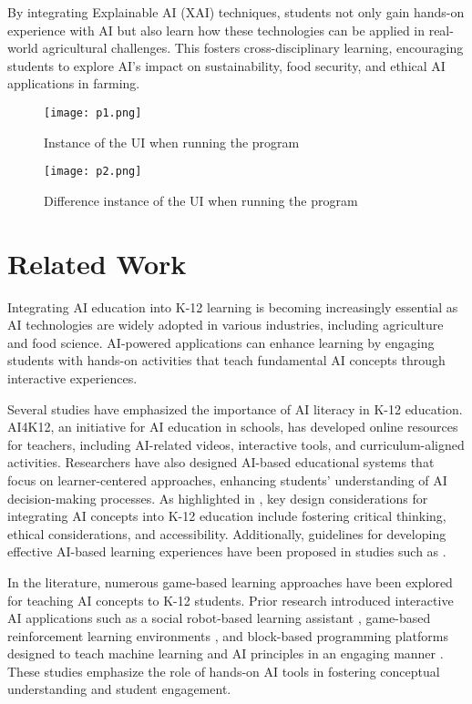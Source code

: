 \documentclass[conference]{IEEEtran}
\begin{document}
By integrating Explainable AI (XAI) techniques, students not only gain hands-on experience with AI but also learn how these technologies can be applied in real-world agricultural challenges. This fosters cross-disciplinary learning, encouraging students to explore AI's impact on sustainability, food security, and ethical AI applications in farming.
\begin{figure}[h]
    \centering
    \texttt{[image: p1.png]}  
    \caption{Instance of the UI when running the program}
    \label{fig:ui1} 
\end{figure}
\begin{figure}[h]
    \centering
    \texttt{[image: p2.png]}  
    \caption{Difference instance of the UI when running the program}
    \label{fig:ui2} 
\end{figure}
\section{Related Work}
Integrating AI education into K-12 learning is becoming increasingly essential as AI technologies are widely adopted in various industries, including agriculture and food science. AI-powered applications can enhance learning by engaging students with hands-on activities that teach fundamental AI concepts through interactive experiences.

Several studies have emphasized the importance of AI literacy in K-12 education. AI4K12, an initiative for AI education in schools, has developed online resources for teachers, including AI-related videos, interactive tools, and curriculum-aligned activities. Researchers have also designed AI-based educational systems that focus on learner-centered approaches, enhancing students’ understanding of AI decision-making processes. As highlighted in \cite{chen2020}, key design considerations for integrating AI concepts into K-12 education include fostering critical thinking, ethical considerations, and accessibility. Additionally, guidelines for developing effective AI-based learning experiences have been proposed in studies such as \cite{pesek2022, mon2023}.

In the literature, numerous game-based learning approaches have been explored for teaching AI concepts to K-12 students. Prior research introduced interactive AI applications such as a social robot-based learning assistant \cite{wu2020}, game-based reinforcement learning environments \cite{jotsov2022}, and block-based programming platforms designed to teach machine learning and AI principles in an engaging manner \cite{pesek2022}. These studies emphasize the role of hands-on AI tools in fostering conceptual understanding and student engagement.
\end{document}
